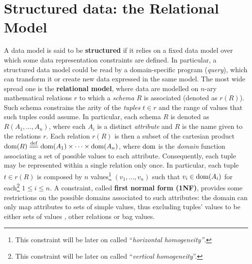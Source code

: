 
\section{Structured data: the Relational Model}\label{sec:relationalcmp}
A data model is said to be \textbf{structured} if it relies on a fixed data model over which some data representation constraints are defined.
In particular, a structured data model could be read by a domain-specific program (\textit{query}), which can transform it or create new data expressed in the same model. The most wide spread one is the \textbf{relational model}, where data are modelled on $n$-ary mathematical relations $r$ \cite{RelGraph} to which a \textit{schema} $R$ is associated (denoted as $r(R)$). Such schema constrains the arity of the \textit{tuples} $t\in r$  and the range of values that such tuples could assume. In particular, each schema $R$ is denoted as $R(A_1,\dots,A_n)$, where each $A_i$ is a distinct \textit{attribute} and $R$ is the name given to the relations $r$. Each relation $r(R)$ is then a subset of the cartesian product $\operatorname{dom}(R)\overset{\mathrm{def}}{=\mathrel{\mkern-3mu}=}\operatorname{dom}(A_1)\times\dots\times \operatorname{dom}(A_n)$, where $\operatorname{dom}$ is the \textit{domain} function associating a set of possible values to each attribute. Consequently, each tuple may be represented within a single relation only once. In particular, each tuple $t\in r(R)$ is composed by $n$ values\footnote{This constraint will be later on called ``\textit{horizontal homogeneity''}.} $(v_1,\dots,v_n)$ such that $v_i\in \operatorname{dom}(A_i)$ for each\footnote{This constraint will be later on called ``\textit{vertical homogeneity}''.} $1\leq i\leq n$. A constraint, called \textbf{first normal form (1NF)}, provides some restrictions on the possible domains associated to such attributes: the domain  can only map attributes to sets of simple values, thus excluding tuples' values to be either sets of values \cite{Codd71a}, other relations \cite{Elmasri} or bag values.

